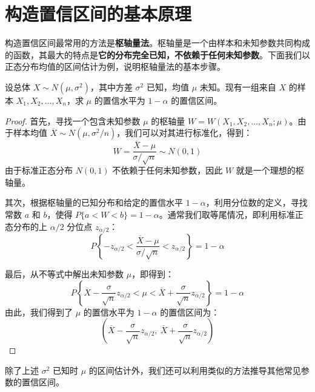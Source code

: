 \documentclass[lang=cn,11pt]{elegantbook}
\begin{document}
\section{构造置信区间的基本原理}

构造置信区间最常用的方法是\textbf{枢轴量法}。枢轴量是一个由样本和未知参数共同构成的函数，其最大的特点是\textbf{它的分布完全已知，不依赖于任何未知参数}。下面我们以正态分布均值的区间估计为例，说明枢轴量法的基本步骤。

\begin{exercise}[正态总体均值的区间估计] \label{ex:pivotal_quantity}
设总体 $X\sim N(\mu,\sigma^2)$，其中方差 $\sigma^2$ 已知，均值 $\mu$ 未知。现有一组来自 $X$ 的样本 $X_1,X_2,\dots,X_n$，求 $\mu$ 的置信水平为 $1-\alpha$ 的置信区间。
\end{exercise}

\begin{proof}
首先，寻找一个包含未知参数 $\mu$ 的枢轴量 $W=W(X_1,X_2,\dots,X_n;\mu)$。由于样本均值 $\overline{X} \sim N(\mu, \sigma^2/n)$，我们可以对其进行标准化，得到：
\begin{equation*}
W=\frac{\overline{X}-\mu}{\sigma/\sqrt{n}}\sim N(0,1)
\end{equation*}
由于标准正态分布 $N(0,1)$ 不依赖于任何未知参数，因此 $W$ 就是一个理想的枢轴量。

其次，根据枢轴量的已知分布和给定的置信水平 $1-\alpha$，利用分位数的定义，寻找常数 $a$ 和 $b$，使得 $P\{a<W<b\}=1-\alpha$。通常我们取等尾情况，即利用标准正态分布的上 $\alpha/2$ 分位点 $z_{\alpha/2}$：
\begin{equation*}
P\left\{-z_{\alpha/2} < \frac{\overline{X}-\mu}{\sigma/\sqrt{n}} < z_{\alpha/2}\right\}=1-\alpha
\end{equation*}

最后，从不等式中解出未知参数 $\mu$，即得到：
\begin{equation*}
P\left\{\overline{X}-\frac{\sigma}{\sqrt{n}}z_{\alpha/2} < \mu < \overline{X}+\frac{\sigma}{\sqrt{n}}z_{\alpha/2}\right\}=1-\alpha
\end{equation*}
由此，我们得到了 $\mu$ 的置信水平为 $1-\alpha$ 的置信区间为：
\begin{equation*}
\left(\overline{X}-\frac{\sigma}{\sqrt{n}}z_{\alpha/2},\ \overline{X}+\frac{\sigma}{\sqrt{n}}z_{\alpha/2}\right)
\end{equation*}
\end{proof}

除了上述 $\sigma^2$ 已知时 $\mu$ 的区间估计外，我们还可以利用类似的方法推导其他常见参数的置信区间。
\end{document}
